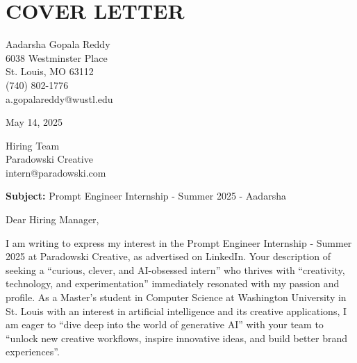 \documentclass[10pt, letterpaper]{article}
\begin{document}
\vspace{\headerSpacing}
\section*{COVER LETTER}

\vspace{\headerSpacing}
\begin{onecolentry}
    Aadarsha Gopala Reddy\\
    6038 Westminster Place\\
    St. Louis, MO 63112\\
    (740) 802-1776\\
    a.gopalareddy@wustl.edu\\
\end{onecolentry}

\vspace{\headerSpacing}
\begin{onecolentry}
    May 14, 2025\\
\end{onecolentry}

\vspace{\headerSpacing}
\begin{onecolentry}
    Hiring Team\\
    Paradowski Creative\\
    intern@paradowski.com
\end{onecolentry}

\vspace{\headerSpacing}
\begin{onecolentry}
    \textbf{Subject:} Prompt Engineer Internship - Summer 2025 - Aadarsha
\end{onecolentry}

\vspace{\headerSpacing}
\begin{onecolentry}
    Dear Hiring Manager,
\end{onecolentry}

\vspace{\headerSpacing}
\begin{onecolentry}
    I am writing to express my interest in the Prompt Engineer Internship - Summer 2025 at Paradowski Creative, as advertised on LinkedIn. Your description of seeking a ``curious, clever, and AI-obsessed intern'' who thrives with ``creativity, technology, and experimentation'' immediately resonated with my passion and profile. As a Master’s student in Computer Science at Washington University in St. Louis with an interest in artificial intelligence and its creative applications, I am eager to ``dive deep into the world of generative AI'' with your team to ``unlock new creative workflows, inspire innovative ideas, and build better brand experiences''.
\end{onecolentry}
\end{document}
